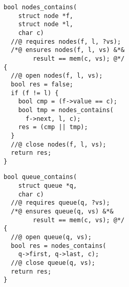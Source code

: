 \vspace{-10pt}
{\noindent
\begin{minipage}[t]{.45\textwidth}
\begin{lstlisting}
bool nodes_contains(
    struct node *f,
    struct node *l,
    char c)
  //@ requires nodes(f, l, ?vs);
  /*@ ensures nodes(f, l, vs) &*&
        result == mem(c, vs); @*/
{
  //@ open nodes(f, l, vs);
  bool res = false;
  if (f != l) {
    bool cmp = (f->value == c);
    bool tmp = nodes_contains(
      f->next, l, c);
    res = (cmp || tmp);
  }
  //@ close nodes(f, l, vs);
  return res;
}
\end{lstlisting}
\end{minipage}
\hfill
\begin{minipage}[t]{.45\textwidth}
\begin{lstlisting}
bool queue_contains(
    struct queue *q,
    char c)
  //@ requires queue(q, ?vs);
  /*@ ensures queue(q, vs) &*&
        result == mem(c, vs); @*/
{
  //@ open queue(q, vs);
  bool res = nodes_contains(
    q->first, q->last, c);
  //@ close queue(q, vs);
  return res;
}
\end{lstlisting}
\end{minipage}
}




